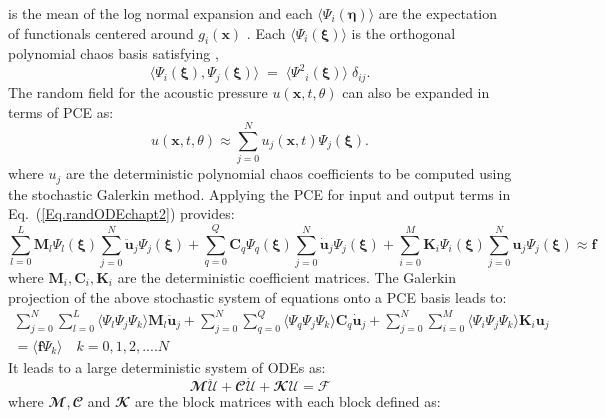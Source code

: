 \documentclass{article}
\begin{document}
is the mean of the log normal expansion and each $ \langle\Psi_i(\bm{\eta})\rangle$ are the expectation of functionals centered around $ g_i(\mathbf{x}) $ \cite{ajit_thesis,subber_thesis,mohammed_thesis}. Each $ \langle\Psi_i(\bm{\xi})\rangle$ is the orthogonal polynomial chaos basis satisfying \cite{book_ghanem},
\begin{equation}\label{Eq.PCEOrtho}
\langle\Psi_i(\bm{\xi}),\Psi_j(\bm{\xi})\rangle \;=\; \langle{{\Psi ^2} _i (\bm{\xi})}\rangle\;\delta_{ij}.
\end{equation}
The random field for the acoustic pressure $u(\mathbf{x},t,\theta)$ can also be expanded in terms of PCE as:
\begin{equation} \label{Eq. uPCE}
u(\mathbf{x},t,\theta) \approx \sum_{j=0}^{N} u_{j}(\mathbf{x},t) \Psi_j(\bm{\xi}).
\end{equation}
where $u_{j}$ are the deterministic polynomial chaos coefficients to be computed 
using the stochastic Galerkin method. 
Applying the PCE for input and output terms in Eq.~(\ref{Eq.randODEchapt2}) provides:
\begin{equation}
\sum_{l=0} ^{L} \mathbf{{M}}_l \Psi_{l}(\bm{\xi}) \sum_{j=0} ^{N}   \ddot{\mathbf{u}}_j   \Psi_{j}(\bm{\xi}) + \sum_{q=0} ^{Q} \mathbf{{C}}_q  \Psi_{q}(\bm{\xi})    \sum_{j=0} ^{N} \dot{\mathbf{u}}_j \Psi_{j}(\bm{\xi})+ \sum_{i=0} ^{M} \mathbf{{K}}_{i}  \Psi_{i}(\bm{\xi})\sum_{j=0} ^{N} \mathbf{u}_{j}  \Psi_{j}(\bm{\xi}) \approx \mathbf{f}
\end{equation}
where $\mathrm{\mathbf{{M}}}_{i}, \mathbf{{C}}_{i},\mathbf{{K}}_{i}$ are the deterministic coefficient matrices. 
The Galerkin projection of the above stochastic system of equations onto a PCE basis leads to:
\begin{align}\label{Eq.galerproject_chap2}
  \sum_{j=0} ^{N} \sum_{l=0} ^{L} \langle  \Psi_{l} \Psi_{j}\Psi_{k} \rangle  \mathbf{M}_l  \ddot{\mathbf{u}}_j   +  \sum_{j=0} ^{N} \sum_{q=0} ^{Q}  \langle  \Psi_{q} \Psi_{j}\Psi_{k}\rangle  \mathbf{C}_q \dot{\mathbf{u}}_j  + \sum_{j=0} ^{N} \sum_{i=0} ^{M}   \langle \Psi_{i} \Psi_{j} \Psi_{k} \rangle \mathbf{K}_i  \mathbf{u}_{j}   \nonumber \\
= \langle \mathbf{f}  \Psi_{k} \rangle   \quad k = 0,1,2,....N
\end{align}
It leads to a large deterministic system of ODEs as:
\begin{equation}
\mathbfcal{M} \ddot{\mathcal{U}}  + \mathbfcal{C}  \dot{\mathcal{U}} + \mathbfcal{K} \mathcal{U} = \mathcal{F}
\end{equation}
where $\mathbfcal{M}, \mathbfcal{C}$ and $\mathbfcal{K}$ are the block matrices with each block defined as:
\end{document}
